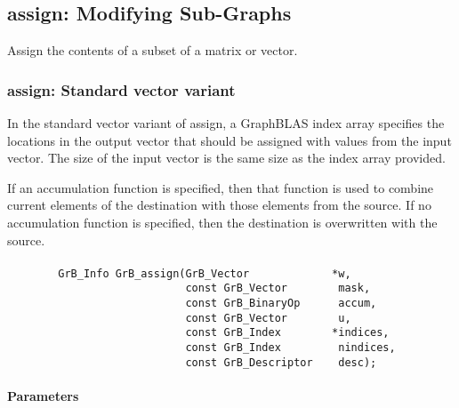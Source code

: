 \subsection{{\sf assign}: Modifying Sub-Graphs}
\label{Sec:assign}

Assign the contents of a subset of a matrix or vector.

\subsubsection{{\sf assign}: Standard vector variant}

In the standard vector variant of {\sf assign}, a GraphBLAS index array specifies
the locations in the output vector that should be assigned with values
from the input vector.  The size of the input vector is the same size as the
index array provided.

If an accumulation function is specified, then that function is used
to combine current elements of the destination with those elements
from the source.  If no accumulation function is specified, then the
destination is overwritten with the source.


\paragraph{\syntax}

\begin{verbatim}
        GrB_Info GrB_assign(GrB_Vector             *w,
                            const GrB_Vector        mask,
                            const GrB_BinaryOp      accum,
                            const GrB_Vector        u,
                            const GrB_Index        *indices,
                            const GrB_Index         nindices,
                            const GrB_Descriptor    desc);
\end{verbatim}

\paragraph{Parameters}

